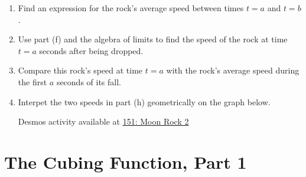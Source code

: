 \documentclass{ximera}
\begin{document}
\begin{example}
\begin{enumerate}
\item Find an expression for the rock's average speed between times $t=a$ and $t=b$.

\item Use part (f) and the algebra of limits to find the speed of the rock at time $t=a$ seconds after being dropped. 

\item Compare this rock's speed at time $t=a$ with the rock's average speed during the first $a$ seconds of its fall. 

\item Interpet the two speeds in part (h) geometrically on the graph below.

\begin{onlineOnly}
    \begin{center}
\end{center}
\end{onlineOnly}

Desmos activity available at
\href{https://www.desmos.com/calculator/v42lwmrlag}{151: Moon Rock 2}


\end{enumerate} 

\end{example}


\section{The Cubing Function, Part 1}
\end{document}
